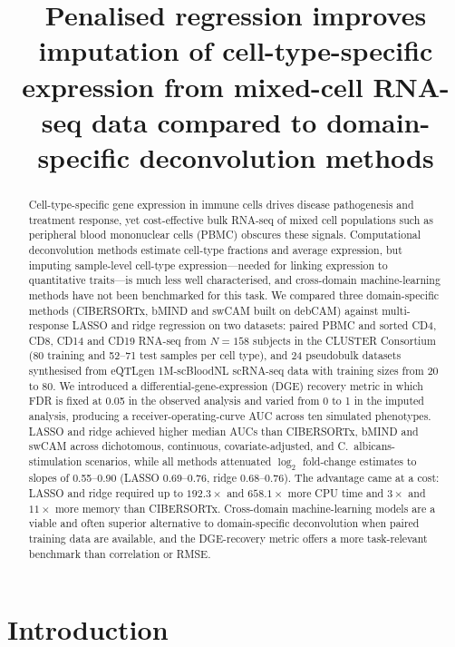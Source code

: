 \documentclass[11pt]{article}
\title{Penalised regression improves imputation of cell-type-specific
expression from mixed-cell RNA-seq data compared to domain-specific
deconvolution methods}
\author{}
\date{}
\begin{document}
\maketitle

\begin{abstract}
Cell-type-specific gene expression in immune cells drives disease
pathogenesis and treatment response, yet cost-effective bulk RNA-seq of
mixed cell populations such as peripheral blood mononuclear cells (PBMC)
obscures these signals. Computational deconvolution methods estimate
cell-type fractions and average expression, but imputing sample-level
cell-type expression---needed for linking expression to quantitative
traits---is much less well characterised, and cross-domain
machine-learning methods have not been benchmarked for this task. We
compared three domain-specific methods (CIBERSORTx, bMIND and swCAM
built on debCAM) against multi-response LASSO and ridge regression on
two datasets: paired PBMC and sorted CD4, CD8, CD14 and CD19 RNA-seq
from $N=158$ subjects in the CLUSTER Consortium (80 training and 52--71
test samples per cell type), and 24 pseudobulk datasets synthesised
from eQTLgen 1M-scBloodNL scRNA-seq data with training sizes from 20 to
80. We introduced a differential-gene-expression (DGE) recovery metric
in which FDR is fixed at 0.05 in the observed analysis and varied from
0 to 1 in the imputed analysis, producing a receiver-operating-curve
AUC across ten simulated phenotypes. LASSO and ridge achieved higher
median AUCs than CIBERSORTx, bMIND and swCAM across dichotomous,
continuous, covariate-adjusted, and C.~albicans-stimulation scenarios,
while all methods attenuated $\log_{2}$ fold-change estimates to slopes
of 0.55--0.90 (LASSO 0.69--0.76, ridge 0.68--0.76). The advantage came
at a cost: LASSO and ridge required up to $192.3\times$ and
$658.1\times$ more CPU time and $3\times$ and $11\times$ more memory
than CIBERSORTx. Cross-domain machine-learning models are a viable and
often superior alternative to domain-specific deconvolution when paired
training data are available, and the DGE-recovery metric offers a more
task-relevant benchmark than correlation or RMSE.
\end{abstract}

\section{Introduction}
\end{document}
